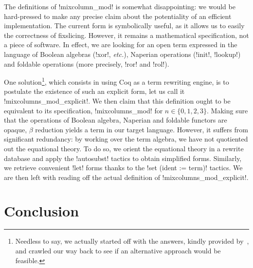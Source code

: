 \documentclass[draft,english]{jflart}
\newcommand{\etc}{\textit{etc.}}
\begin{document}


The definitions of \coqe!mixcolumn_mod! is somewhat disappointing: we
would be hard-pressed to make any precise claim about the potentiality
of an efficient implementation. The current form is symbolically
useful, as it allows us to easily the correctness of fixslicing.
However, it remains a mathematical specification, not a piece of
software. In effect, we are looking for an open term expressed in the
language of Boolean algebras (\coqe!xor!, \etc{}), Naperian operations
(\coqe!init!, \coqe!lookup!) and foldable operations (more precisely,
\coqe!ror! and \coqe!rol!).

One solution\footnote{Needless to say, we actually started off with
the answers, kindly provided by~\citet{adomi}, and crawled our way
back to see if an alternative approach would be feasible.}, which
consists in using Coq as a term rewriting engine, is to postulate the
existence of such an explicit form, let us call it
%
\coqe!mixcolumns_mod_explicit!.
%
We then claim that this definition ought to be equivalent to its
specification, \coqe!mixcolumns_mod! for $n \in \{0, 1, 2, 3\}$.
Making sure that the operations of Boolean algebra, Naperian and
foldable functors are opaque, $\beta$ reduction yields a term in our
target language. However, it suffers from significant redundancy: by
working over the term algebra, we have not quotiented out the
equational theory. To do so, we orient the equational theory in a
rewrite database and apply the \coqe!autosubst! tactics to obtain
simplified forms. Similarly, we retrieve convenient \coqe!let! forms
thanks to the \coqe!set (ident := term)! tactics. We are then left
with reading off the actual definition of
\coqe!mixcolumns_mod_explicit!.



\section{Conclusion}
\end{document}
